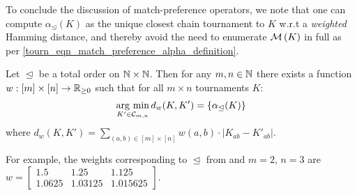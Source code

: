 

To conclude the discussion of match-preference operators, we note that one can
compute $\alpha_{\trianglelefteq}(K)$ as the unique closest chain tournament to
$K$ w.r.t a \emph{weighted} Hamming distance, and thereby avoid the need to
enumerate $\operatorname{\mathcal{M}}\left({K}\right)$ in full as per
\cref{tourn_eqn_match_preference_alpha_definition}.

\begin{theorem}
   \label{tourn_prop_matchpref_weightings}

    Let $\trianglelefteq$ be a total order on $\mathbb{N} \times \mathbb{N}$. Then for any $m,
    n \in \mathbb{N}$ there exists a function $w: [m] \times [n] \to \mathbb{R}_{\ge 0}$ such
    that for all $m \times n$ tournaments $K$:
    \begin{equation}
        \label{tourn_eqn_matchpref_argmin}
        \operatorname*{arg\ min}_{K' \in \mathcal{C}_{m,n}}{d_w(K, K')} = \{\alpha_{\trianglelefteq}(K)\}
    \end{equation}
    where $d_w(K, K') = \sum_{(a,b) \in [m] \times [n]}{w(a,b) \cdot |K_{ab} -
    K'_{ab}|}$.

\end{theorem}


For example, the weights corresponding to $\trianglelefteq$ from
 and $m = 2$, $n = 3$ are
$
    w = \left[\begin{smallmatrix}
        1.5 & 1.25 & 1.125 \\
        1.0625 & 1.03125 & 1.015625
    \end{smallmatrix}\right]
$.

